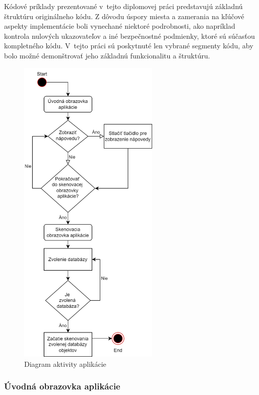 Kódové príklady prezentované v~tejto diplomovej práci predstavujú základnú štruktúru originálneho kódu. Z dôvodu úspory miesta a zamerania na kľúčové aspekty implementácie boli vynechané niektoré podrobnosti, ako napríklad kontrola nulových ukazovateľov a iné bezpečnostné podmienky, ktoré sú súčasťou kompletného kódu. V~tejto práci sú poskytnuté len vybrané segmenty kódu, aby bolo možné demonštrovať jeho základnú funkcionalitu a štruktúru. 

\begin{figure}[h]
  \centering
  \includegraphics[width=0.6\textwidth]{img/diagram_aktivit.jpg}
  \caption{Diagram aktivity aplikácie}
  \label{fig:flowChart}
\end{figure}

\FloatBarrier 

\subsubsection{Úvodná obrazovka aplikácie} 

